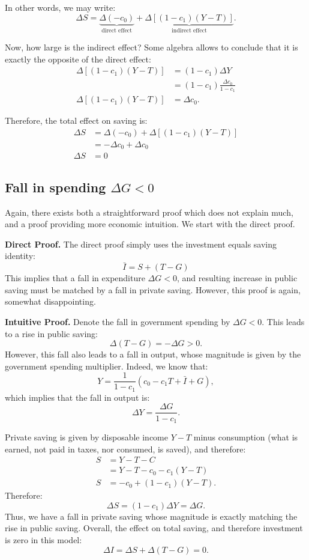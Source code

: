 \documentclass[]{book}
\theoremstyle{definition}
\theoremstyle{definition}
\theoremstyle{definition}
\theoremstyle{remark}
\begin{document}
In other words, we may write:
\[\Delta S=\underbrace{\Delta(-c_{0})}_{\text{direct effect}}+\underbrace{\Delta\left[\left(1-c_{1}\right)\left(Y-T\right)\right]}_{\text{indirect effect}}.\]

Now, how large is the indirect effect? Some algebra allows to conclude
that it is exactly the opposite of the direct effect: \[\begin{aligned}
\Delta\left[\left(1-c_{1}\right)\left(Y-T\right)\right] &=(1-c_{1})\Delta Y\\
    &=(1-c_{1})\frac{\Delta c_{0}}{1-c_{1}}\\
\Delta\left[\left(1-c_{1}\right)\left(Y-T\right)\right] &=\Delta c_{0}.
\end{aligned}
\]

Therefore, the total effect on saving is: \[\begin{aligned}
\Delta S    &=\Delta(-c_{0})+\Delta\left[\left(1-c_{1}\right)\left(Y-T\right)\right]\\
    &=-\Delta c_{0}+\Delta c_{0}\\
\Delta S    &=0
\end{aligned}
\]

\subsection{\texorpdfstring{Fall in spending
\(\Delta G<0\)}{Fall in spending \textbackslash{}Delta G\textless{}0}}\label{fall-in-spending-delta-g0}

Again, there exists both a straightforward proof which does not explain
much, and a proof providing more economic intuition. We start with the
direct proof.

\textbf{Direct Proof.} The direct proof simply uses the investment
equals saving identity: \[\bar{I} = S + (T-G)\] This implies that a fall
in expenditure \(\Delta G<0\), and resulting increase in public saving
must be matched by a fall in private saving. However, this proof is
again, somewhat disappointing.

\textbf{Intuitive Proof.} Denote the fall in government spending by
\(\Delta G<0\). This leads to a rise in public saving:
\[\Delta(T-G)=-\Delta G>0.\] However, this fall also leads to a fall in
output, whose magnitude is given by the government spending multiplier.
Indeed, we know that:
\[Y=\frac{1}{1-c_{1}}\left(c_{0}-c_{1}T+\bar{I}+G\right),\] which
implies that the fall in output is:
\[\Delta Y=\frac{\Delta G}{1-c_{1}}.\]

Private saving is given by disposable income \(Y-T\) minus consumption
(what is earned, not paid in taxes, nor consumed, is saved), and
therefore: \[
\begin{aligned}
S   &= Y-T-C\\
&= Y-T-c_{0}-c_{1}\left(Y-T\right)\\
S   &=-c_{0}+\left(1-c_{1}\right)\left(Y-T\right).
\end{aligned}
\] Therefore: \[\Delta S=(1-c_{1})\Delta Y=\Delta G.\] Thus, we have a
fall in private saving whose magnitude is exactly matching the rise in
public saving. Overall, the effect on total saving, and therefore
investment is zero in this model: \[\Delta I  =\Delta S+\Delta(T-G)=0.\]
\end{document}
